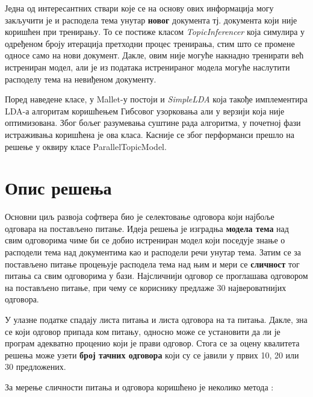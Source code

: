 Једна од интересантних ствари које се на основу ових информација могу закључити је и расподела тема унутар \textbf{новог} документа тј. документа који није коришћен при тренирању. То се постиже класом \textit{TopicInferencer} која симулира  у одређеном броју итерација претходни процес тренирања, стим што се промене односе само на нови документ. Дакле, овим није могуће накнадно тренирати већ истрениран модел, али је из података истренираног модела могуће наслутити расподелу тема на невиђеном документу.

Поред наведене класе, у Mallet-у постоји и \textit{SimpleLDA}  која такође имплементира LDA-а алгоритам коришћењем Гибсовог узорковања али у верзији која није оптимизована. Због бољег разумевања суштине рада алгоритма, у почетној фази истраживања коришћена је ова класа. Касније се због перформанси прешло на решење у оквиру класе  ParallelTopicModel.


\section{Опис решења}

Основни циљ развоја софтвера био је селектовање одговора који најбоље одговара на постављено питање. Идеја решења је изградња \textbf{модела тема} над свим одговорима чиме би се добио истрениран модел који поседује знање о расподели тема над документима као и расподели речи унутар тема. Затим се за  постављено питање процењује расподела тема над њим и мери се \textbf{сличност} тог питања са свим одговорима у бази. Најсличнији одговор се проглашава одговором на постављено питање, при чему се кориснику предлаже 30 највероватнијих одговора.

У улазне податке спадају листа питања и листа одговора на та питања. Дакле, зна се који одговор припада ком питању, односно може се установити да ли је програм адекватно проценио који је прави одговор. Стога се за оцену квалитета решења може узети \textbf{број тачних одговора} који су се јавили у првих 10, 20 или 30 предложених. 

За мерење сличности питања и одговора коришћено је неколико метода :

